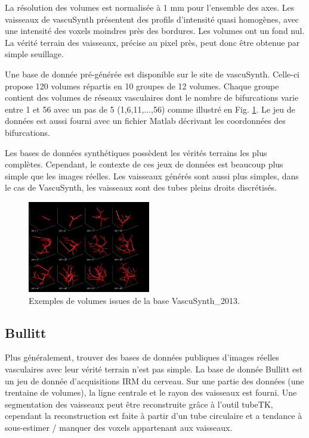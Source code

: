 La résolution des volumes est  normalisée à 1 mm pour l'ensemble des axes. Les vaisseaux de vascuSynth présentent des profils d'intensité quasi homogènes, avec une intensité des voxels moindres près des bordures. Les volumes ont un fond nul. La vérité terrain des vaisseaux, précise au pixel près, peut donc être obtenue par simple seuillage.

Une base de donnée pré-générée est disponible sur le site de vascuSynth. Celle-ci propose 120 volumes répartis en 10 groupes de 12 volumes. Chaque groupe contient des volumes de réseaux vasculaires dont le nombre de bifurcations varie entre 1 et 56 avec un pas de 5 (1,6,11,...,56) comme illustré en Fig. \ref{fig:VascuSynth}. Le jeu de données est aussi fourni avec un fichier Matlab décrivant les coordonnées des bifurcations.

Les bases de données synthétiques possèdent les vérités terrains les plus complètes. Cependant, le contexte de ces jeux de données est beaucoup plus simple que les images réelles. Les vaisseaux générés sont aussi plus simples, dans le cas de VascuSynth, les vaisseaux sont des tubes pleins droits discrétisés.

\begin{figure}
    \centering
    \includegraphics[height=4cm]{Images/snapVascu.png}
    \caption{Exemples de volumes issues de la base VascuSynth\_2013.}
    \label{fig:VascuSynth}
\end{figure}

\subsection{Bullitt}

Plus généralement, trouver des bases de données publiques d'images réelles vasculaires avec leur vérité terrain n'est pas simple. La base de donnée Bullitt est un jeu de donnée d'acquisitions IRM du cerveau. Sur une partie des données (une trentaine de volumes), la ligne centrale et le rayon des vaisseaux est fourni. Une segmentation des vaisseaux peut être reconstruite grâce à l'outil tubeTK, cependant la reconstruction est faite à partir d'un tube circulaire et a tendance à sous-estimer / manquer des voxels appartenant aux vaisseaux.

